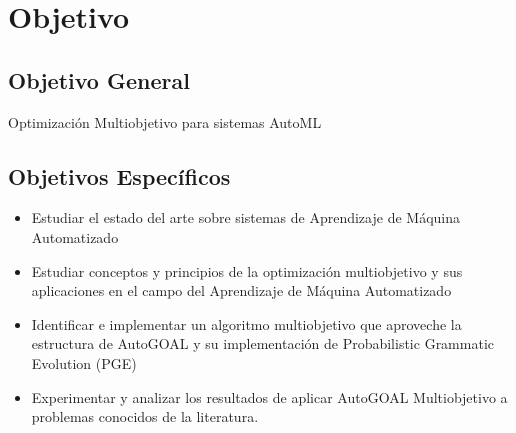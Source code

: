 


 
\section*{Objetivo}
\subsection*{Objetivo General}
Optimizaci\'on Multiobjetivo para sistemas AutoML
\subsection*{Objetivos Espec\'ificos}
\begin{itemize}
    \item Estudiar el estado del arte sobre sistemas de Aprendizaje de M\'aquina Automatizado
    \item Estudiar conceptos y principios de la optimizaci\'on multiobjetivo y sus aplicaciones en el campo del Aprendizaje de M\'aquina Automatizado
    \item Identificar e implementar un algoritmo multiobjetivo que aproveche la estructura de AutoGOAL y su implementaci\'on de Probabilistic Grammatic Evolution (PGE)
    \item Experimentar y analizar los resultados de aplicar AutoGOAL Multiobjetivo a problemas conocidos de la literatura.
\end{itemize}

